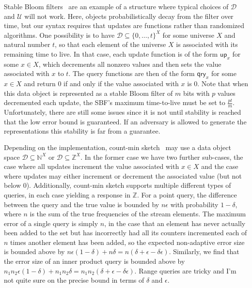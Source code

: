 Stable Bloom filters~\cite{xxx} are an example of a structure where typical choices of $\mathcal{D}$ and $\mathcal{U}$ will not work. Here, objects probabilistically decay from the filter over time, but our syntax requires that updates are functions rather than randomized algorithms.   One possibility is to have $\mathcal{D} \subseteq \{0,\ldots,t\}^X$ for some universe $X$ and natural number $t$, so that each element of the universe $X$ is associated with its remaining time to live.   In that case, each update function is of the form $\mathsf{up}_x$ for some $x \in X$, which decrements all nonzero values and then sets the value associated with $x$ to $t$. The query functions are then of the form $\mathsf{qry}_x$ for some $x \in X$ and return 0 if and only if the value associated with $x$ is 0. Note that when this data object is represented as a stable Bloom filter of $m$ bits with $p$ values decremented each update, the SBF's maximum time-to-live must be set to $\frac{pt}{m}$. Unfortunately, there are still some issues since it is not until stability is reached that the low error bound is guaranteed. If an adversary is allowed to generate the representations this stability is far from a guarantee.

Depending on the implementation, count-min sketch~\cite{xxx} may use a data object space $\mathcal{D} \subseteq \mathbb{N}^X$ or $\mathcal{D} \subseteq \mathbb{Z}^X$. In the former case we have two further sub-cases, the case where all updates increment the value associated with $x \in X$ and the case where updates may either increment or decrement the associated value (but not below 0). Additionally, count-min sketch supports multiple different types of queries, in each case yielding a response in $\mathbb{Z}$. For a point query, the difference between the query and the true value is bounded by $n\epsilon$ with probability $1-\delta$, where $n$ is the sum of the true frequencies of the stream elements. The maximum error of a single query is simply $n$, in the case that an element has never actually been added to the set but has incorrectly had all its counters incremented each of $n$ times another element has been added, so the expected non-adaptive error size is bounded above by $n\epsilon(1-\delta)+n\delta = n(\delta+\epsilon-\delta\epsilon)$.  Similarly, we find that the error size of an inner product query is bounded above by $n_1n_2\epsilon(1-\delta)+n_1n_2\delta = n_1n_2(\delta+\epsilon-\delta\epsilon)$. Range queries are tricky and I'm not quite sure on the precise bound in terms of $\delta$ and $\epsilon$.

